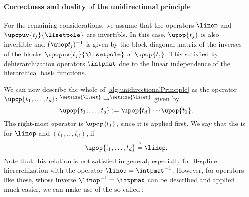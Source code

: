 %  

\paragraph{Correctness and duality of the unidirectional principle}

For the remaining considerations, we assume that
the operators $\linop$ and $\upopuv{t_j}{\lisetpole}$ are invertible.
In this case, $\upop{t_j}$ is also invertible and
$\upopinv{t_j}$ is given by the block-diagonal matrix of
the inverses of the blocks $\upopuv{t_j}{\lisetpole}$ of $\upop{t_j}$.
This satisfied by dehierarchization operators $\intpmat$ due to the
linear independence of the hierarchical basis functions.

We can now describe the whole \up of
\cref{alg:unidirectionalPrinciple} as the operator
$\upop{t_1,\dotsc,t_d}\colon \real^{\setsize{\liset}} \to
\real^{\setsize{\liset}}$ given by
\begin{equation}
  \label{eq:upopProduct}
  \upop{t_1,\dotsc,t_d}
  := \upop{t_d} \dotsm \upop{t_1}.
\end{equation}
The right-most operator is $\upop{t_1}$, since it is applied first.
We say that the \up is  for $\linop$ and
$(t_1, \dotsc, t_d)$, if
\begin{equation}
  \upop{t_1,\dotsc,t_d}
  \overset{?}{=} \linop.
\end{equation}
Note that this relation is not satisfied in general,
especially for B-spline hierarchization with the operator
$\linop = \intpmatinv$.
However, for operators like these, whose inverse
$\linopinv = \intpmat$ can be described and applied much easier,
we can make use of the so-called :


